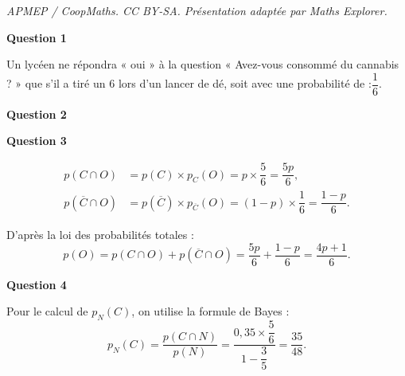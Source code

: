 \documentclass[10pt]{article}
\begin{document}
\noindent\textit{APMEP / CoopMaths. CC BY-SA. Présentation adaptée par Maths Explorer.}\par\medskip
\textbf{Question 1}

Un lycéen ne répondra « oui » à la question « Avez-vous consommé du cannabis ? » que s'il a tiré un 6 lors d'un lancer de dé, soit avec une probabilité de :$\dfrac{1}{6}.
$

\textbf{Question 2}

\begin{center}
\end{center}

\textbf{Question 3}

\begin{align*}
	p(C \cap O) &= p(C) \times p_C(O) = p \times \dfrac{5}{6} = \dfrac{5p}{6}, \\
	p(\overline{C} \cap O) &= p(\overline{C}) \times p_{\overline{C}}(O) = (1 - p) \times \dfrac{1}{6} = \dfrac{1 - p}{6}.
\end{align*}

D'après la loi des probabilités totales :
\[
p(O) = p(C \cap O) + p(\overline{C} \cap O) = \dfrac{5p}{6} + \dfrac{1 - p}{6} = \dfrac{4p + 1}{6}.
\]

\textbf{Question 4}

Pour le calcul de $p_N(C)$, on utilise la formule de Bayes :
\[
p_N(C) = \dfrac{p(C \cap N)}{p(N)} = \dfrac{0,35 \times \dfrac{5}{6}}{1 - \dfrac{3}{5}} = \dfrac{35}{48}.
\]
\end{document}
